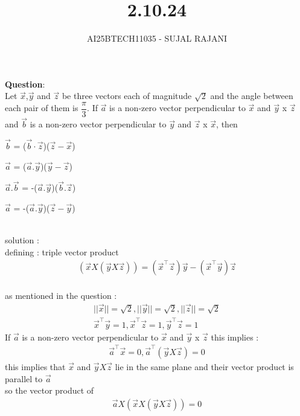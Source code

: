 \documentclass[journal,12pt,onecolumn]{IEEEtran}
\begin{document}
\title{2.10.24}
\author{AI25BTECH11035 - SUJAL RAJANI}
{\let\newpage\relax\maketitle}
\textbf{Question}:
\\
 Let $\vec{x}$,$\vec{y}$ and $\vec{z}$ be three vectors each of magnitude $\sqrt 2$ and the angle between each pair of them is $\dfrac{\pi}{3}$. If $\vec{a}$ is a non-zero vector perpendicular to $\vec{x}$ and $\vec{y}$ x $\vec{z}$ and $\vec{b}$ is a non-zero vector perpendicular to $\vec{y}$ and $\vec{z}$ x $\vec{x}$, then
 \begin{enumerate}
 \begin{multicols}{2}
     \item  $\vec{b}$ = ($\vec{b}\cdot\vec{z}$)($\vec{z}-\vec{x}$)
      \item  $\vec{a}$ = ($\vec{a}.\vec{y}$)($\vec{y}-\vec{z}$)
       \item  $\vec{a}.\vec{b}$ = -($\vec{a}.\vec{y}$)($\vec{b}.\vec{z}$)
       \item  $\vec{a}$ = -($\vec{a}.\vec{y}$)($\vec{z}-\vec{y}$)
 \end{multicols} 
 \end{enumerate}
\\
solution :
\\
defining : triple vector product 
\begin{align*}
    (\vec{x}X(\vec{y} X \vec{z}))=(\vec{x}^\top \vec{z})\vec{y}-(\vec{x}^\top \vec{y})\vec{z}
\end{align*}
\\
as mentioned in the question : 
\begin{align*}
    ||\vec{x}||=\sqrt{2},
    ||\vec{y}||=\sqrt{2},
    ||\vec{z}||=\sqrt{2}
    \\
\vec{x}^\top\vec{y}=1,\vec{x}^\top\vec{z}=1,\vec{y}^\top\vec{z}=1
\end{align*}
If $\vec{a}$ is a non-zero vector perpendicular to $\vec{x}$ and $\vec{y}$ x $\vec{z}$ this implies :
\\
\begin{align*}
    \vec{a}^\top\vec{x}=0, \vec{a}^\top(\vec{y} X \vec{z})=0
\end{align*}
this implies that  $\vec{x}$ and $\vec{y} X \vec{z}$ lie in the same plane and their vector product is parallel to $\vec{a}$
\\
so the vector product of 
\\
\begin{align*}
    \vec{a}X(\vec{x}X(\vec{y} X \vec{z}))=0
\end{align*}
\end{document}
